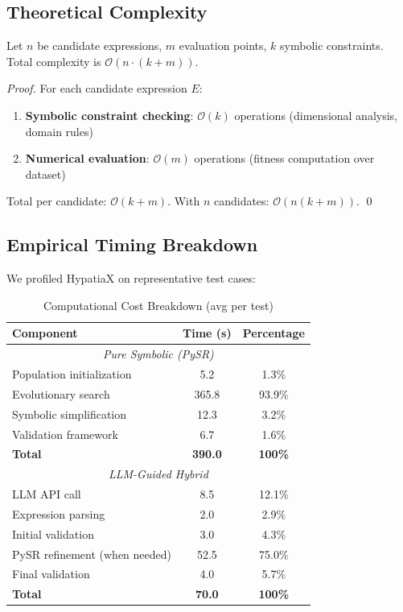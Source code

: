 \subsection{Theoretical Complexity}

\begin{proposition}
Let $n$ be candidate expressions, $m$ evaluation points, $k$ symbolic constraints. Total complexity is $\mathcal{O}(n \cdot (k + m))$.
\end{proposition}

\begin{proof}
For each candidate expression $E$:
\begin{enumerate}
\item \textbf{Symbolic constraint checking}: $\mathcal{O}(k)$ operations (dimensional analysis, domain rules)
\item \textbf{Numerical evaluation}: $\mathcal{O}(m)$ operations (fitness computation over dataset)
\end{enumerate}

Total per candidate: $\mathcal{O}(k + m)$. With $n$ candidates: $\mathcal{O}(n(k + m))$. \qed
\end{proof}

\subsection{Empirical Timing Breakdown}

We profiled HypatiaX on representative test cases:

\begin{table}[H]
\centering
\caption{Computational Cost Breakdown (avg per test)}
\label{tab:timing_breakdown}
\begin{tabular}{@{}lcc@{}}
\toprule
\textbf{Component} & \textbf{Time (s)} & \textbf{Percentage} \\
\midrule
\multicolumn{3}{c}{\textit{Pure Symbolic (PySR)}} \\
\midrule
Population initialization & 5.2 & 1.3\% \\
Evolutionary search & 365.8 & 93.9\% \\
Symbolic simplification & 12.3 & 3.2\% \\
Validation framework & 6.7 & 1.6\% \\
\midrule
\textbf{Total} & \textbf{390.0} & \textbf{100\%} \\
\midrule
\multicolumn{3}{c}{\textit{LLM-Guided Hybrid}} \\
\midrule
LLM API call & 8.5 & 12.1\% \\
Expression parsing & 2.0 & 2.9\% \\
Initial validation & 3.0 & 4.3\% \\
PySR refinement (when needed) & 52.5 & 75.0\% \\
Final validation & 4.0 & 5.7\% \\
\midrule
\textbf{Total} & \textbf{70.0} & \textbf{100\%} \\
\bottomrule
\end{tabular}
\end{table}

